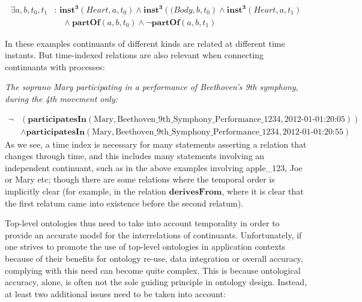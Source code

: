 \documentclass{ao2e}
\newcommand{\mirel}[1]{\ensuremath{\mathrm{\mathbf{#1}}}}
\newcommand{\mclass}[1]{\ensuremath{\mathit{#1}}}
\begin{document}
\begin{equation}
\begin{split}
\exists a, b, t_0, t_1&:\, \mirel{inst^3}(\mclass{Heart},a,t_0)
\wedge \mirel{inst^3}(\mclass(Body,b,t_0)
\wedge \mirel{inst^3}(\mclass{Heart},a,t_1) \\
&\quad \wedge \mirel{partOf}(a,b,t_0)
\wedge \neg\mirel{partOf}(a,b,t_1)
\end{split}
\end{equation}

In these examples continuants of different kinds are related at different time
instants. But time-indexed relations are also relevant when connecting
continuants with processes: 

\vspace{1\baselineskip}
\noindent\emph{The soprano Mary participating in a performance of Beethoven’s
9th symphony, during the 4th movement only:}

\begin{equation}
\begin{split}
\neg&(\mirel{participatesIn}(\text{Mary},
\text{Beethoven\_9th\_Symphony\_Performance\_1234},
\text{2012-01-01:20:05})) \\
&\wedge\mirel{participatesIn}(\text{Mary},
\text{Beethoven\_9th\_Symphony\_Performance\_1234}, \text{2012-01-01:20:55}) 
\end{split}
\end{equation}
As we see, a time index is necessary for many statements asserting a relation
that changes through time, and this includes many statements involving an
independent continuant, such as in the above examples involving apple\_123, Joe
or Mary etc; though there are some relations where the temporal order is
implicitly clear (for example, in the relation \mirel{derivesFrom}, where it is
clear that the first relatum came into existence before the second relatum).

Top-level ontologies thus need to take into account temporality in order to
provide an accurate model for the interrelations of continuants. Unfortunately,
if one strives to promote the use of top-level ontologies in application
contexts because of their benefits for ontology re-use, data integration or
overall accuracy, complying with this need can become quite complex. This is
because ontological accuracy, alone, is often not the sole guiding principle in
ontology design. Instead, at least two additional issues need to be taken into
account:
\end{document}
